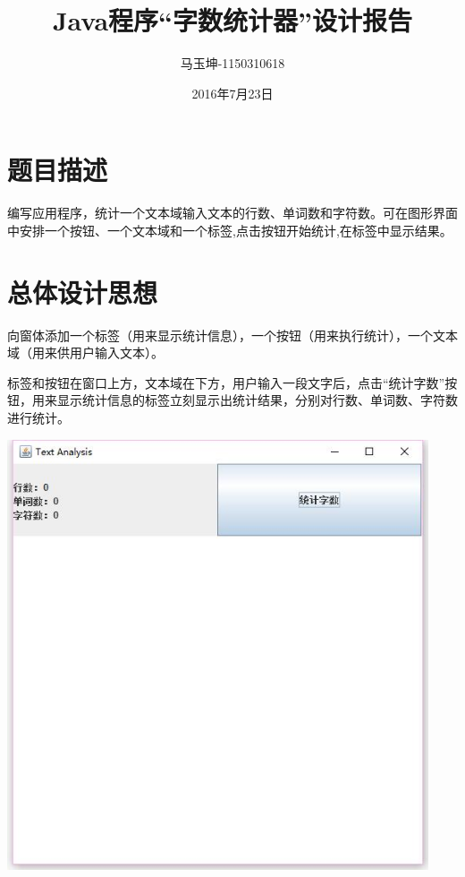 \documentclass[11pt, a4paper]{article}
\begin{document}
\begin{CJK*}{UTF8}{gbsn}
  \title{\bf Java程序“字数统计器”设计报告}
  \author{马玉坤-1150310618}
  \date{2016年7月23日}
  \maketitle

  \renewcommand{\contentsname}{\textbf{目录}}
  \tableofcontents
  \newpage
  \newpage
  
  \section{题目描述}
  
  编写应用程序，统计一个文本域输入文本的行数、单词数和字符数。可在图形界面中安排一个按钮、一个文本域和一个标签,点击按钮开始统计,在标签中显示结果。
  
  \section{总体设计思想}

  向窗体添加一个标签（用来显示统计信息），一个按钮（用来执行统计），一个文本域（用来供用户输入文本）。

  标签和按钮在窗口上方，文本域在下方，用户输入一段文字后，点击“统计字数”按钮，用来显示统计信息的标签立刻显示出统计结果，分别对行数、单词数、字符数进行统计。

  \begin{center}
    \includegraphics[height=5in]{window.jpg}
  \end{center}


\end{CJK*}
\end{document}
